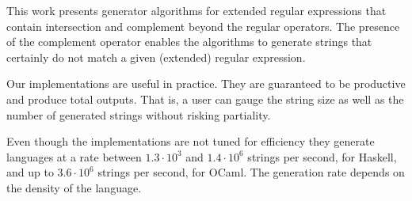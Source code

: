 \documentclass{article}
\begin{document}
This work presents generator algorithms for extended regular expressions that
contain intersection and complement beyond the regular operators. The
presence of the complement operator enables the algorithms to generate
strings that certainly do not match a given (extended) regular
expression.

Our implementations are useful in practice. They are guaranteed to be
productive and produce total outputs. That is, a user can gauge the
string size as well as the number of generated strings without risking
partiality.

Even though the implementations
are not tuned for efficiency they generate
languages at a rate between $1.3\cdot10^3$ and $1.4\cdot10^6$ strings per
second, for Haskell, and up to $3.6\cdot10^6$ strings per second, for
OCaml. The generation rate depends on the density of the language.



\end{document}
